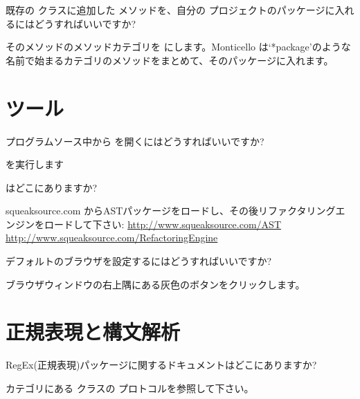 \documentclass[a4paper,10pt,twoside]{book}
\begin{document}
\begin{faq}
既存の  クラスに追加した  メソッドを、自分の  プロジェクトのパッケージに入れるにはどうすればいいですか?
\end{faq}
\answer
そのメソッドのメソッドカテゴリを  にします。Monticello は‘*package’のような名前で始まるカテゴリのメソッドをまとめて、そのパッケージに入れます。

\section{ツール}

\begin{faq}
プログラムソース中から   を開くにはどうすればいいですか?
\end{faq}
\answer
  を実行します

\begin{faq}
 はどこにありますか? 
\end{faq}
\answer
squeaksource.com からASTパッケージをロードし、その後リファクタリングエンジンをロードして下さい:
\url{http://www.squeaksource.com/AST}
\url{http://www.squeaksource.com/RefactoringEngine}

\begin{faq}
デフォルトのブラウザを設定するにはどうすればいいですか?
\end{faq}
\answer
ブラウザウィンドウの右上隅にある灰色のボタンをクリックします。

\section{正規表現と構文解析}


\begin{faq}
RegEx(正規表現)パッケージに関するドキュメントはどこにありますか?
\end{faq}
\answer
{} カテゴリにある  クラスの  プロトコルを参照して下さい。
\end{document}
